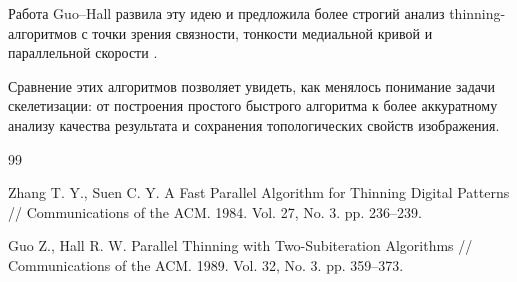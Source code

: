 \documentclass[12pt,a4paper]{article}
\begin{document}
	Работа Guo--Hall развила эту идею и предложила более строгий анализ thinning-алгоритмов с точки зрения связности, тонкости медиальной кривой и параллельной скорости \cite{guo1989}.
	
	Сравнение этих алгоритмов позволяет увидеть, как менялось понимание задачи скелетизации: от построения простого быстрого алгоритма к более аккуратному анализу качества результата и сохранения топологических свойств изображения.
	
	\begin{thebibliography}{99}
		
		Zhang T. Y., Suen C. Y.
		A Fast Parallel Algorithm for Thinning Digital Patterns //
		Communications of the ACM.
		1984.
		Vol. 27, No. 3.
		pp. 236--239.
		
		Guo Z., Hall R. W.
		Parallel Thinning with Two-Subiteration Algorithms //
		Communications of the ACM.
		1989.
		Vol. 32, No. 3.
		pp. 359--373.
		
	\end{thebibliography}
	
\end{document}
